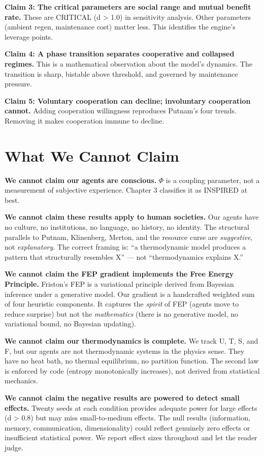 \textbf{Claim 3: The critical parameters are social range and mutual benefit rate.} These are CRITICAL (d \textgreater{} 1.0) in sensitivity analysis. Other parameters (ambient regen, maintenance cost) matter less. This identifies the engine's leverage points.

\textbf{Claim 4: A phase transition separates cooperative and collapsed regimes.} This is a mathematical observation about the model's dynamics. The transition is sharp, bistable above threshold, and governed by maintenance pressure.

\textbf{Claim 5: Voluntary cooperation can decline; involuntary cooperation cannot.} Adding cooperation willingness reproduces Putnam's four trends. Removing it makes cooperation immune to decline.

\section{What We Cannot Claim}\label{what-we-cannot-claim}

\textbf{We cannot claim our agents are conscious.} $\Phi$ is a coupling parameter, not a measurement of subjective experience. Chapter 3 classifies it as INSPIRED at best.

\textbf{We cannot claim these results apply to human societies.} Our agents have no culture, no institutions, no language, no history, no identity. The structural parallels to Putnam, Klinenberg, Merton, and the resource curse are \emph{suggestive}, not \emph{explanatory}. The correct framing is: ``a thermodynamic model produces a pattern that structurally resembles X'' --- not ``thermodynamics explains X.''

\textbf{We cannot claim the FEP gradient implements the Free Energy Principle.} Friston's FEP is a variational principle derived from Bayesian inference under a generative model. Our gradient is a handcrafted weighted sum of four heuristic components. It captures the \emph{spirit} of FEP (agents move to reduce surprise) but not the \emph{mathematics} (there is no generative model, no variational bound, no Bayesian updating).

\textbf{We cannot claim our thermodynamics is complete.} We track U, T, S, and F, but our agents are not thermodynamic systems in the physics sense. They have no heat bath, no thermal equilibrium, no partition function. The second law is enforced by code (entropy monotonically increases), not derived from statistical mechanics.

\textbf{We cannot claim the negative results are powered to detect small effects.} Twenty seeds at each condition provides adequate power for large effects (d \textgreater{} 0.8) but may miss small-to-medium effects. The null results (information, memory, communication, dimensionality) could reflect genuinely zero effects or insufficient statistical power. We report effect sizes throughout and let the reader judge.

